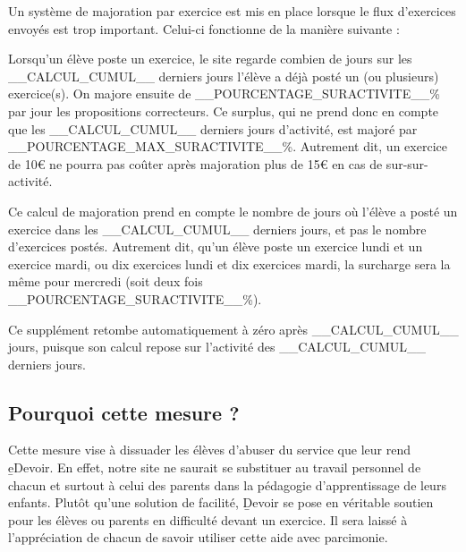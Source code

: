 ﻿Un système de majoration par exercice est mis en place lorsque le flux d'exercices envoyés est trop important. Celui-ci fonctionne de la manière suivante :
\item Lorsqu'un élève poste un exercice, le site regarde combien de jours sur les __CALCUL_CUMUL__ derniers jours l'élève a déjà posté un (ou plusieurs) exercice(s). On majore ensuite de __POURCENTAGE_SURACTIVITE__\% par jour les propositions correcteurs. Ce surplus, qui ne prend donc en compte que les __CALCUL_CUMUL__ derniers jours d'activité, est majoré par __POURCENTAGE_MAX_SURACTIVITE__\%. Autrement dit, un exercice de 10€ ne pourra pas coûter après majoration plus de 15€ en cas de sur-sur-activité.
\item Ce calcul de majoration prend en compte le nombre de jours où l'élève a posté un exercice dans les __CALCUL_CUMUL__ derniers jours, et pas le nombre d'exercices postés. Autrement dit, qu'un élève poste un exercice lundi et un exercice mardi, ou dix exercices lundi et dix exercices mardi, la surcharge sera la même pour mercredi (soit deux fois __POURCENTAGE_SURACTIVITE__\%).
\item Ce supplément retombe automatiquement à zéro après __CALCUL_CUMUL__ jours, puisque son calcul repose sur l'activité des __CALCUL_CUMUL__ derniers jours.

\subsection{Pourquoi cette mesure ?}

Cette mesure vise à dissuader les élèves d'abuser du service que leur rend \b{eDevoir}. En effet, notre site ne saurait se substituer au travail personnel de chacun et surtout à celui des parents dans la pédagogie d'apprentissage de leurs enfants. Plutôt qu'une solution de facilité, \b{Devoir} se pose en véritable soutien pour les élèves ou parents en difficulté devant un exercice.
Il sera laissé à l'appréciation de chacun de savoir utiliser cette aide avec parcimonie.